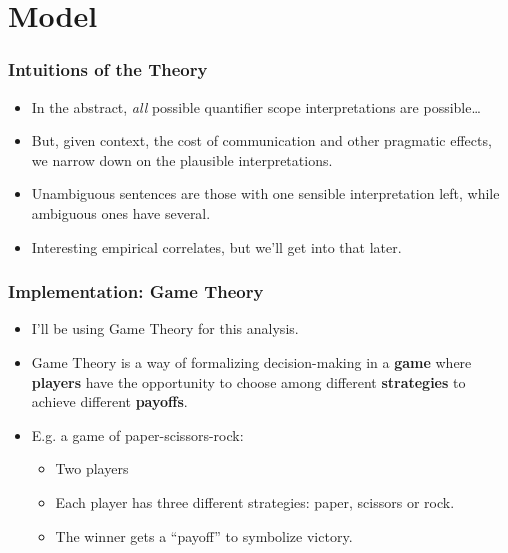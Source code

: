 \documentclass[aspectratio=169]{beamer}
\begin{document}
\section{Model}

\begin{frame}
	\frametitle{Intuitions of the Theory}\pause

	\begin{itemize}
		\item In the abstract, \emph{all} possible quantifier scope interpretations are possible\ldots\pause
		\item But, given context, the cost of communication and other pragmatic effects, we narrow down on the plausible interpretations.\pause
		\item Unambiguous sentences are those with one sensible interpretation left, while ambiguous ones have several.\pause
		\item Interesting empirical correlates, but we'll get into that later.
	\end{itemize}

\end{frame}


\begin{frame}
	\frametitle{Implementation: Game Theory}\pause

	\begin{itemize}
		\item I'll be using Game Theory for this analysis.\pause
		\item Game Theory is a way of formalizing decision-making in a \textbf{game} where \textbf{players} have the opportunity to choose among different \textbf{strategies} to achieve different \textbf{payoffs}.\pause
		\item E.g. a game of paper-scissors-rock:\pause
			\begin{itemize}
				\item Two players\pause
				\item Each player has three different strategies: paper, scissors or rock.\pause
				\item The winner gets a ``payoff'' to symbolize victory.
			\end{itemize}
	\end{itemize}
\end{frame}
\end{document}

